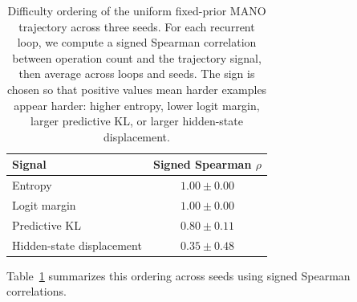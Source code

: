 \documentclass[10pt]{article} %
\begin{document}
\begin{table}[!htbp]
\centering
\caption{
Difficulty ordering of the uniform fixed-prior MANO trajectory across three seeds.
For each recurrent loop, we compute a signed Spearman correlation between operation count and the trajectory signal, then average across loops and seeds.
The sign is chosen so that positive values mean harder examples appear harder: higher entropy, lower logit margin, larger predictive KL, or larger hidden-state displacement.
}
\label{tab:uniform_difficulty_ordering}
\begin{tabular}{lc}
\toprule
Signal & Signed Spearman $\rho$ \\
\midrule
Entropy & $1.00 \pm 0.00$ \\
Logit margin & $1.00 \pm 0.00$ \\
Predictive KL & $0.80 \pm 0.11$ \\
Hidden-state displacement & $0.35 \pm 0.48$ \\
\bottomrule
\end{tabular}
\end{table}

Table~\ref{tab:uniform_difficulty_ordering} summarizes this ordering across seeds using signed Spearman correlations.
\end{document}
